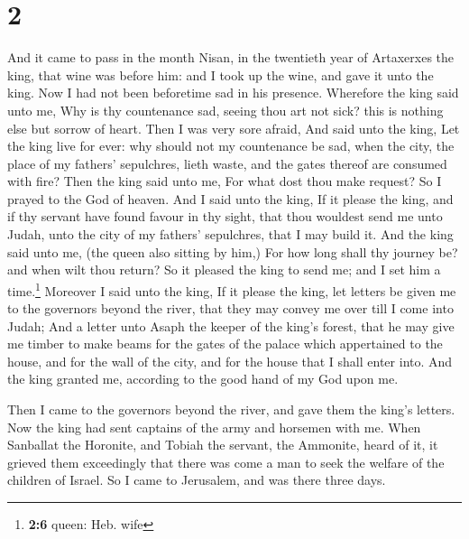 \hypertarget{section-1}{%
\section{2}\label{section-1}}

 And it came to pass in the month Nisan, in the twentieth
year of Artaxerxes the king, that wine was before him: and I took up the
wine, and gave it unto the king. Now I had not been beforetime sad in
his presence.  Wherefore the king said unto me, Why is thy
countenance sad, seeing thou art not sick? this is nothing else but
sorrow of heart. Then I was very sore afraid,  And said
unto the king, Let the king live for ever: why should not my countenance
be sad, when the city, the place of my fathers' sepulchres, lieth waste,
and the gates thereof are consumed with fire?  Then the
king said unto me, For what dost thou make request? So I prayed to the
God of heaven.  And I said unto the king, If it please the
king, and if thy servant have found favour in thy sight, that thou
wouldest send me unto Judah, unto the city of my fathers' sepulchres,
that I may build it.  And the king said unto me, (the
queen also sitting by him,) For how long shall thy journey be? and when
wilt thou return? So it pleased the king to send me; and I set him a
time.\footnote{\textbf{2:6} queen: Heb. wife}  Moreover I
said unto the king, If it please the king, let letters be given me to
the governors beyond the river, that they may convey me over till I come
into Judah;  And a letter unto Asaph the keeper of the
king's forest, that he may give me timber to make beams for the gates of
the palace which appertained to the house, and for the wall of the city,
and for the house that I shall enter into. And the king granted me,
according to the good hand of my God upon me.

 Then I came to the governors beyond the river, and gave
them the king's letters. Now the king had sent captains of the army and
horsemen with me.  When Sanballat the Horonite, and
Tobiah the servant, the Ammonite, heard of it, it grieved them
exceedingly that there was come a man to seek the welfare of the
children of Israel.  So I came to Jerusalem, and was
there three days.

